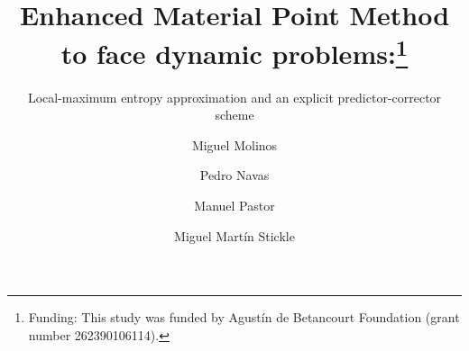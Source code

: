 %

\newcommand{\Matrix}[1]{
  \ensuremath{\mathbf{{#1}}}
}
\newcommand{\Vector}[1]{
  \ensuremath{\mathbf{{#1}}}
}

\newcommand{\Div}[1]{
  \ensuremath{div({#1})}
}
\newcommand\Grad[1]{grad({#1})}
\newcommand\GradS[1]{grad^s({#1})}
\newcommand\GradT[1]{grad^T({#1})}


\newcommand{\Deriv}[3][]{
  \ensuremath{\frac{\partial^{#1}{#2}}{ \partial {#3}^{#1} }}
}

\newcommand{\Integral}[2]{
  \IfStrEqCase{#1}{
    {2}{\ensuremath{\int_{\varGamma_d}{#2}\ d\varGamma}}
    {3}{\ensuremath{\int_{\varOmega}{#2}\ d\varOmega}}
  }
}

%
%



\title{Enhanced Material Point Method to face
  dynamic problems:\thanks{Funding: This
    study was funded by Agustín de Betancourt Foundation (grant number
    262390106114).}
}
\subtitle{Local-maximum entropy approximation and an explicit
  predictor-corrector scheme}


\author{Miguel Molinos \and
  Pedro Navas \and
  Manuel Pastor \and
  Miguel Martín Stickle
}




